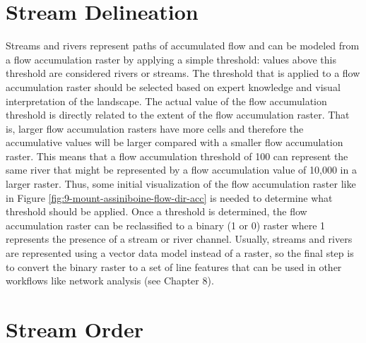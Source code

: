 \documentclass[
]{book}
\begin{document}
\hypertarget{stream-delineation}{%
\section{Stream Delineation}\label{stream-delineation}}

Streams and rivers represent paths of accumulated flow and can be modeled from a flow accumulation raster by applying a simple threshold: values above this threshold are considered rivers or streams. The threshold that is applied to a flow accumulation raster should be selected based on expert knowledge and visual interpretation of the landscape. The actual value of the flow accumulation threshold is directly related to the extent of the flow accumulation raster. That is, larger flow accumulation rasters have more cells and therefore the accumulative values will be larger compared with a smaller flow accumulation raster. This means that a flow accumulation threshold of 100 can represent the same river that might be represented by a flow accumulation value of 10,000 in a larger raster. Thus, some initial visualization of the flow accumulation raster like in Figure \ref{fig:9-mount-assiniboine-flow-dir-acc} is needed to determine what threshold should be applied. Once a threshold is determined, the flow accumulation raster can be reclassified to a binary (1 or 0) raster where 1 represents the presence of a stream or river channel. Usually, streams and rivers are represented using a vector data model instead of a raster, so the final step is to convert the binary raster to a set of line features that can be used in other workflows like network analysis (see Chapter 8).

\hypertarget{stream-order}{%
\section{Stream Order}\label{stream-order}}
\end{document}
